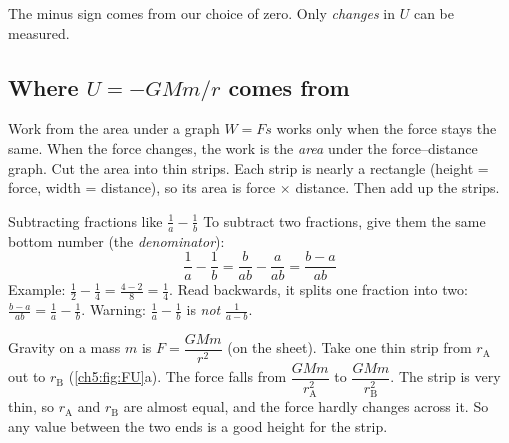 The minus sign comes from our choice of zero. Only \emph{changes} in $U$ can be
measured.

\subsection{Where $U = -GMm/r$ comes from}

\begin{toolkit}{Work from the area under a graph}
$W = Fs$ works only when the force stays the same. When the force changes, the
work is the \emph{area} under the force--distance graph. Cut the area into thin
strips. Each strip is nearly a rectangle (height = force, width = distance), so
its area is force $\times$ distance. Then add up the strips.
\end{toolkit}

\begin{toolkit}{Subtracting fractions like $\frac{1}{a} - \frac{1}{b}$}
To subtract two fractions, give them the same bottom number (the
\emph{denominator}):
\[ \frac{1}{a} - \frac{1}{b} = \frac{b}{ab} - \frac{a}{ab} = \frac{b - a}{ab} \]
Example: $\tfrac{1}{2} - \tfrac{1}{4} = \tfrac{4 - 2}{8} = \tfrac{1}{4}$. Read
backwards, it splits one fraction into two:
$\tfrac{b - a}{ab} = \tfrac{1}{a} - \tfrac{1}{b}$. Warning:
$\tfrac{1}{a} - \tfrac{1}{b}$ is \emph{not} $\tfrac{1}{a - b}$.
\end{toolkit}

Gravity on a mass $m$ is $F = \dfrac{GMm}{r^2}$ (on the sheet). Take one thin
strip from $r_\mathrm{A}$ out to $r_\mathrm{B}$ (\cref{ch5:fig:FU}a). The force falls from
$\dfrac{GMm}{r_\mathrm{A}^2}$ to $\dfrac{GMm}{r_\mathrm{B}^2}$. The strip is very thin, so $r_\mathrm{A}$
and $r_\mathrm{B}$ are almost equal, and the force hardly changes across it. So any value
between the two ends is a good height for the strip.

